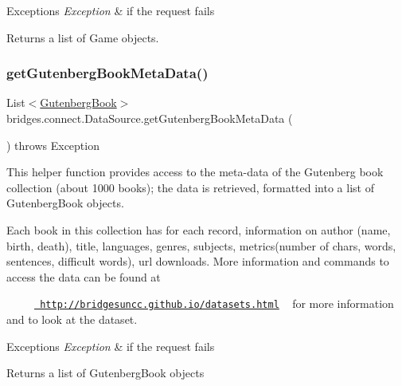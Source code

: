 \begin{DoxyExceptions}{Exceptions}
{\em Exception} & if the request fails\\
\hline
\end{DoxyExceptions}
\begin{DoxyReturn}{Returns}
a list of Game objects. 
\end{DoxyReturn}
\mbox{\label{classbridges_1_1connect_1_1_data_source_aff3adc9d08624062469315f2fe059044}} 
\subsubsection{\texorpdfstring{getGutenbergBookMetaData()}{getGutenbergBookMetaData()}}
{\footnotesize\ttfamily List$<$\mbox{\hyperlink{classbridges_1_1data__src__dependent_1_1_gutenberg_book}{Gutenberg\+Book}}$>$ bridges.\+connect.\+Data\+Source.\+get\+Gutenberg\+Book\+Meta\+Data (\begin{DoxyParamCaption}{ }\end{DoxyParamCaption}) throws Exception}

This helper function provides access to the meta-\/data of the Gutenberg book collection (about 1000 books); the data is retrieved, formatted into a list of Gutenberg\+Book objects.

Each book in this collection has for each record, information on author (name, birth, death), title, languages, genres, subjects, metrics(number of chars, words, sentences, difficult words), url downloads. More information and commands to access the data can be found at 

~~~~~\href{http://bridgesuncc.github.io/datasets.html}{\texttt{ http\+://bridgesuncc.\+github.\+io/datasets.\+html}} ~\newline
 for more information and to look at the dataset.


\begin{DoxyExceptions}{Exceptions}
{\em Exception} & if the request fails\\
\hline
\end{DoxyExceptions}
\begin{DoxyReturn}{Returns}
a list of Gutenberg\+Book objects 
\end{DoxyReturn}
\mbox{\label{classbridges_1_1connect_1_1_data_source_ae82f6a4feff0af28f4aae55986e1560c}} 
